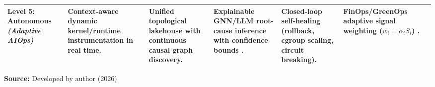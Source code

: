 \begin{table}[!ht]
\begin{tabularx}{\textwidth}{@{} p{2.0cm} X X X X X p{1.6cm} @{}}
\addlinespace
\textbf{Level 5: Autonomous} \newline \textit{(Adaptive AIOps)} & Context-aware dynamic kernel/runtime instrumentation in real time. & Unified topological lakehouse with continuous causal graph discovery. & Explainable GNN/LLM root-cause inference with confidence bounds \cite{han_2024}. & Closed-loop self-healing (rollback, cgroup scaling, circuit breaking). & FinOps/GreenOps adaptive signal weighting ($w_i = \alpha_i S_i$) \cite{amgothu_2025}. & \cite{deng_2024, gomes_2025, han_2024, amgothu_2025} \\
\bottomrule
\end{tabularx}
\par\medskip
\ABNTEXfontereduzida\selectfont\textbf{Source:} Developed by author (2026)
\end{table}

